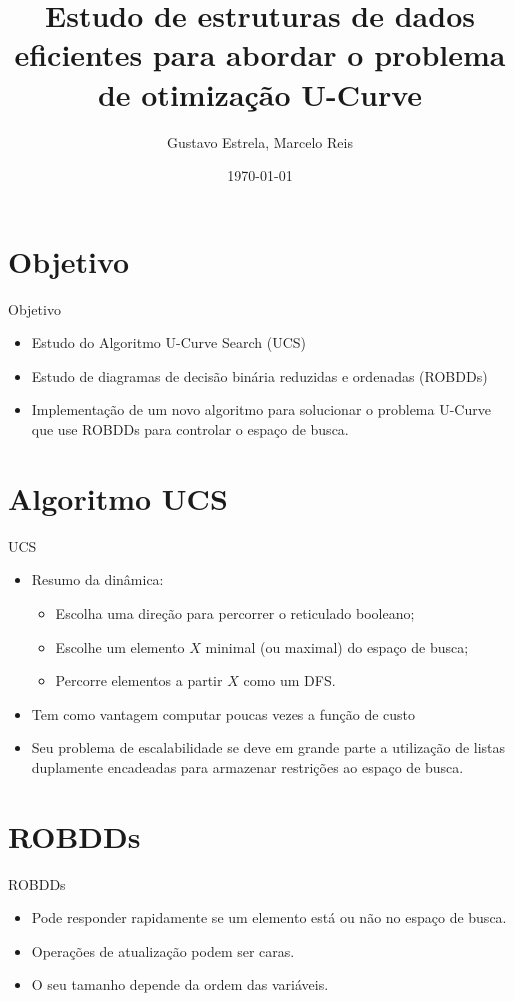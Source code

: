 \documentclass{beamer}
\title[]{Estudo de estruturas de dados eficientes para abordar o 
problema de otimização U-Curve}
\author{Gustavo Estrela, Marcelo Reis}
\institute{Universidade de São Paulo e Instituto Butantan}
\date{\today}
\begin{document}
\begin{frame}
  \titlepage
\end{frame}

\section{Objetivo}
\begin{frame}{Objetivo}
    \begin{itemize}
        \item{Estudo do Algoritmo U-Curve Search (UCS) 
            \protect\cite{msreis thesis}}
        \item{Estudo de diagramas de decisão binária reduzidas e
            ordenadas (ROBDDs)}
        \item{Implementação de um novo algoritmo para solucionar o 
            problema U-Curve que use ROBDDs para controlar o espaço de
            busca.}
    \end{itemize}
\end{frame}

\section{Algoritmo UCS}
\begin{frame}{UCS}
    \begin{itemize}
        \item{Resumo da dinâmica:}
        \begin{itemize}
            \item{Escolha uma direção para percorrer o reticulado 
                booleano;}
            \item{Escolhe um elemento $X$ minimal (ou maximal) do
                espaço de busca;}
            \item{Percorre elementos a partir $X$ como um DFS.}
        \end{itemize}
        \item{Tem como vantagem computar poucas vezes a função de 
            custo}
        \item{Seu problema de escalabilidade se deve em grande parte
            a utilização de listas duplamente encadeadas para armazenar
            restrições ao espaço de busca.}
    \end{itemize}
\end{frame}

\section{ROBDDs}
\begin{frame}{ROBDDs}
    \begin{itemize} 
        \item{Pode responder rapidamente se um elemento está ou não
            no espaço de busca.}
        \item{Operações de atualização podem ser caras.}
        \item{O seu tamanho depende da ordem das variáveis.}
        
    \end{itemize}
\end{frame}
\end{document}
